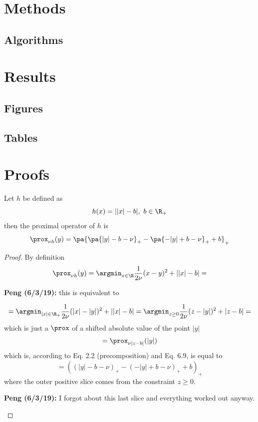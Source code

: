 \documentclass[11pt,letterpaper]{article}
\newcommand{\Peng}[1]{\textbf{Peng (#1):}}
\numberwithin{equation}{section} %
\numberwithin{figure}{section} %
\numberwithin{table}{section} %
\begin{document}
\section{Methods} %
\label{sec:methods}

\subsection{Algorithms} %
\label{sub:algorithms}

\section{Results} %
\label{sec:results}

\subsection{Figures} %
\label{sub:figures}


\subsection{Tables} 
\clearpage


\appendix
\section{Proofs}
\begin{lemma}
    \label{lemma:phase_retrieval_prox}
    Let $h$ be defined as
    \[
        h(x) = ||x|-b|, \ b \in \R_+ 
    \]
    then the proximal operator of $h$ is 
    \[
        \prox_{\nu h}(y) = \pa{\pa{|y| - b - \nu}_+ - \pa{-|y| + b - \nu}_+ + b}_+
    \]
\end{lemma}
\begin{proof}
    By definition 
    \[
        \prox_{\nu h}(y) = \argmin_{x \in \R} \frac{1}{2\nu}(x - y)^2 + ||x|-b| = 
    \]
    \begin{tip}
    \Peng{6/3/19} this is equivalent to
    \end{tip} 
    \[
        = \argmin_{|x| \in \R_+} \frac{1}{2\nu}(|x|-|y|)^2 + ||x| - b| = \argmin_{z \geq 0}\frac{1}{2\nu}(z - |y|)^2 + |z-b| = 
    \]
    which is just a $\prox$ of a shifted absolute value of the point $|y|$
    \[
        = \prox_{\nu|z-b|}(|y|)
    \]
    which is, according to \cite{Parikh2014} Eq. 2.2 (precomposition) and Eq. 6.9, is equal to
    \[
        = ((|y| - b - \nu)_+ - (-|y|+b - \nu)_+ + b)_+
    \]
    where the outer positive slice comes from the constraint $z \geq 0$.
    \begin{tip}
        \Peng{6/3/19} I forgot about this last slice and everything worked out anyway. 
    \end{tip}

\end{proof}
\end{document}
